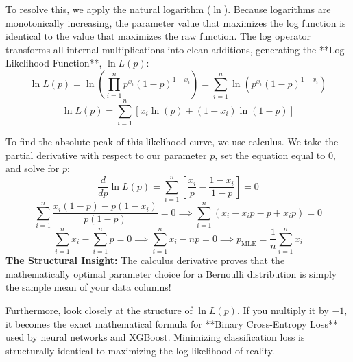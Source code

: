 \documentclass[12pt,a4paper]{article}
\begin{document}
To resolve this, we apply the natural logarithm ($\ln$). Because logarithms are monotonically increasing, the parameter value that maximizes the log function is identical to the value that maximizes the raw function. The log operator transforms all internal multiplications into clean additions, generating the **Log-Likelihood Function**, $\ln L(p)$:
$$\ln L(p) = \ln \left( \prod_{i=1}^n p^{x_i}(1-p)^{1-x_i} \right) = \sum_{i=1}^n \ln \left( p^{x_i}(1-p)^{1-x_i} \right)$$
$$\ln L(p) = \sum_{i=1}^n \left[ x_i \ln(p) + (1-x_i) \ln(1-p) \right]$$

To find the absolute peak of this likelihood curve, we use calculus. We take the partial derivative with respect to our parameter $p$, set the equation equal to $0$, and solve for $p$:
$$\frac{d}{dp} \ln L(p) = \sum_{i=1}^n \left[ \frac{x_i}{p} - \frac{1-x_i}{1-p} \right] = 0$$
$$\sum_{i=1}^n \frac{x_i(1-p) - p(1-x_i)}{p(1-p)} = 0 \implies \sum_{i=1}^n (x_i - x_ip - p + x_ip) = 0$$
$$\sum_{i=1}^n x_i - \sum_{i=1}^n p = 0 \implies \sum_{i=1}^n x_i - np = 0 \implies p_{\text{MLE}} = \frac{1}{n} \sum_{i=1}^n x_i$$
\textbf{The Structural Insight:} The calculus derivative proves that the mathematically optimal parameter choice for a Bernoulli distribution is simply the sample mean of your data columns! 

Furthermore, look closely at the structure of $\ln L(p)$. If you multiply it by $-1$, it becomes the exact mathematical formula for **Binary Cross-Entropy Loss** used by neural networks and XGBoost. Minimizing classification loss is structurally identical to maximizing the log-likelihood of reality.
\end{document}
